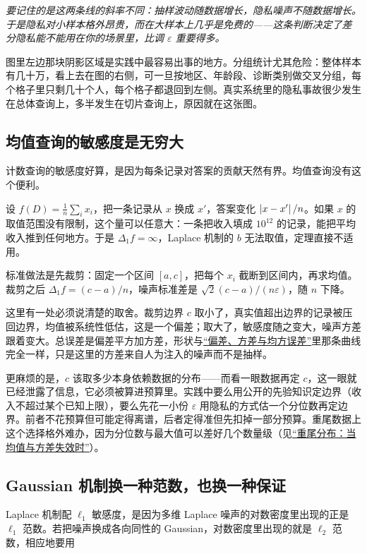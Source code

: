 \emph{要记住的是这两条线的斜率不同：抽样波动随数据增长，隐私噪声不随数据增长。于是隐私对小样本格外昂贵，而在大样本上几乎是免费的——这条判断决定了差分隐私能不能用在你的场景里，比调 \(\varepsilon\) 重要得多。}

图里左边那块阴影区域是实践中最容易出事的地方。分组统计尤其危险：整体样本有几十万，看上去在图的右侧，可一旦按地区、年龄段、诊断类别做交叉分组，每个格子里只剩几十个人，每个格子都退回到左侧。真实系统里的隐私事故很少发生在总体查询上，多半发生在切片查询上，原因就在这张图。

\subsection{均值查询的敏感度是无穷大}

计数查询的敏感度好算，是因为每条记录对答案的贡献天然有界。均值查询没有这个便利。

设 \(f(D)=\frac1n\sum_i x_i\)，把一条记录从 \(x\) 换成 \(x'\)，答案变化 \(\left|x-x'\right|/n\)。如果 \(x\) 的取值范围没有限制，这个量可以任意大：一条把收入填成 \(10^{12}\) 的记录，能把平均收入推到任何地方。于是 \(\Delta_1 f=\infty\)，Laplace 机制的 \(b\) 无法取值，定理直接不适用。

标准做法是先裁剪：固定一个区间 \([a,c]\)，把每个 \(x_i\) 截断到区间内，再求均值。裁剪之后 \(\Delta_1 f=(c-a)/n\)，噪声标准差是 \(\sqrt2 (c-a)/(n\varepsilon)\)，随 \(n\) 下降。

这里有一处必须说清楚的取舍。裁剪边界 \(c\) 取小了，真实值超出边界的记录被压回边界，均值被系统性低估，这是一个偏差；取大了，敏感度随之变大，噪声方差跟着变大。总误差是偏差平方加方差，形状与\hyperref[sec:11-Mathematical-Statistics/02-Point-Estimation/01]{``偏差、方差与均方误差''}里那条曲线完全一样，只是这里的方差来自人为注入的噪声而不是抽样。

更麻烦的是，\(c\) 该取多少本身依赖数据的分布——而看一眼数据再定 \(c\)，这一眼就已经泄露了信息，它必须被算进预算里。实践中要么用公开的先验知识定边界（收入不超过某个已知上限），要么先花一小份 \(\varepsilon\) 用隐私的方式估一个分位数再定边界。前者不花预算但可能定得离谱，后者定得准但先扣掉一部分预算。重尾数据上这个选择格外难办，因为分位数与最大值可以差好几个数量级（见\hyperref[sec:05-Probability/06-Common-Distributions/07]{``重尾分布：当均值与方差失效时''}）。

\subsection{Gaussian 机制换一种范数，也换一种保证}

Laplace 机制配 \(\ell_1\) 敏感度，是因为多维 Laplace 噪声的对数密度里出现的正是 \(\ell_1\) 范数。若把噪声换成各向同性的 Gaussian，对数密度里出现的就是 \(\ell_2\) 范数，相应地要用

